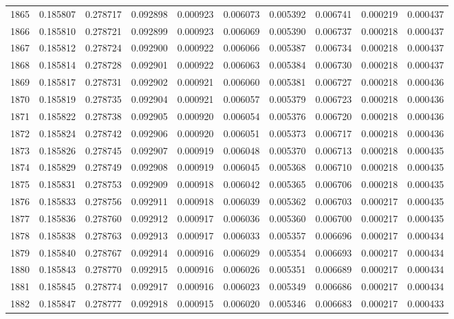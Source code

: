 \begin{tabular}{lrrrrrrrrr}
1865 & 0.185807 & 0.278717 & 0.092898 & 0.000923 & 0.006073 & 0.005392 & 0.006741 & 0.000219 & 0.000437 \\
1866 & 0.185810 & 0.278721 & 0.092899 & 0.000923 & 0.006069 & 0.005390 & 0.006737 & 0.000218 & 0.000437 \\
1867 & 0.185812 & 0.278724 & 0.092900 & 0.000922 & 0.006066 & 0.005387 & 0.006734 & 0.000218 & 0.000437 \\
1868 & 0.185814 & 0.278728 & 0.092901 & 0.000922 & 0.006063 & 0.005384 & 0.006730 & 0.000218 & 0.000437 \\
1869 & 0.185817 & 0.278731 & 0.092902 & 0.000921 & 0.006060 & 0.005381 & 0.006727 & 0.000218 & 0.000436 \\
1870 & 0.185819 & 0.278735 & 0.092904 & 0.000921 & 0.006057 & 0.005379 & 0.006723 & 0.000218 & 0.000436 \\
1871 & 0.185822 & 0.278738 & 0.092905 & 0.000920 & 0.006054 & 0.005376 & 0.006720 & 0.000218 & 0.000436 \\
1872 & 0.185824 & 0.278742 & 0.092906 & 0.000920 & 0.006051 & 0.005373 & 0.006717 & 0.000218 & 0.000436 \\
1873 & 0.185826 & 0.278745 & 0.092907 & 0.000919 & 0.006048 & 0.005370 & 0.006713 & 0.000218 & 0.000435 \\
1874 & 0.185829 & 0.278749 & 0.092908 & 0.000919 & 0.006045 & 0.005368 & 0.006710 & 0.000218 & 0.000435 \\
1875 & 0.185831 & 0.278753 & 0.092909 & 0.000918 & 0.006042 & 0.005365 & 0.006706 & 0.000218 & 0.000435 \\
1876 & 0.185833 & 0.278756 & 0.092911 & 0.000918 & 0.006039 & 0.005362 & 0.006703 & 0.000217 & 0.000435 \\
1877 & 0.185836 & 0.278760 & 0.092912 & 0.000917 & 0.006036 & 0.005360 & 0.006700 & 0.000217 & 0.000435 \\
1878 & 0.185838 & 0.278763 & 0.092913 & 0.000917 & 0.006033 & 0.005357 & 0.006696 & 0.000217 & 0.000434 \\
1879 & 0.185840 & 0.278767 & 0.092914 & 0.000916 & 0.006029 & 0.005354 & 0.006693 & 0.000217 & 0.000434 \\
1880 & 0.185843 & 0.278770 & 0.092915 & 0.000916 & 0.006026 & 0.005351 & 0.006689 & 0.000217 & 0.000434 \\
1881 & 0.185845 & 0.278774 & 0.092917 & 0.000916 & 0.006023 & 0.005349 & 0.006686 & 0.000217 & 0.000434 \\
1882 & 0.185847 & 0.278777 & 0.092918 & 0.000915 & 0.006020 & 0.005346 & 0.006683 & 0.000217 & 0.000433 \\

\end{tabular}
